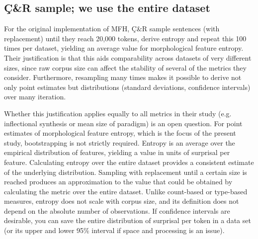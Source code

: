 \documentclass[USenglish]{article}
\begin{document}

\subsection{Ç\&R sample; we use the entire dataset}\label{appedix:differences_sampling}

For the original implementation of MFH, Ç\&R sample sentences (with replacement) until they reach 20,000 tokens, derive entropy and repeat this 100 times per dataset, yielding an average value for morphological feature entropy.
Their justification is that this aids comparability across datasets of very different sizes, since raw corpus size can affect the stability of several of the metrics they consider. 
Furthermore, resampling many times makes it possible to derive not only point estimates but distributions (standard deviations, confidence intervals) over many iteration.

Whether this justification applies equally to all metrics in their study (e.g. inflectional synthesis or mean size of paradigm) is an open question. 
For point estimates of morphological feature entropy, which is the focus of the present study, bootstrapping is not strictly required. 
Entropy is an average over the empirical distribution of features, yielding a value in units of surprisal per feature. 
Calculating entropy over the entire dataset provides a consistent estimate of the underlying distribution.
Sampling with replacement until a certain size is reached produces an approximation to the value that could be obtained by calculating the metric over the entire dataset.
Unlike count-based or type-based measures, entropy does not scale with corpus size, and its definition does not depend on the absolute number of observations.
If confidence intervals are desirable, you can save the entire distribution of surprisal per token in a data set (or its upper and lower 95\% interval if space and processing is an issue).
\end{document}
